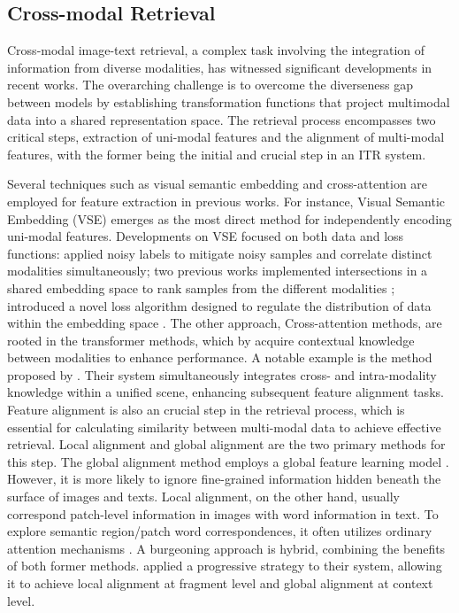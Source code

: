 \documentclass[sigconf, nonacm]{acmart}
\begin{document}
\subsection{Cross-modal Retrieval}
Cross-modal image-text retrieval, a complex task involving the integration of information from diverse modalities, has witnessed significant developments in recent works. The overarching challenge is to overcome the diverseness gap between models by establishing transformation functions that project multimodal data into a shared representation space. The retrieval process encompasses two critical steps, extraction of uni-modal features and the alignment of multi-modal features, with the former being the initial and crucial step in an ITR system.

Several techniques such as visual semantic embedding and cross-attention are employed for feature extraction in previous works. For instance, Visual Semantic Embedding (VSE) emerges as the most direct method for independently encoding uni-modal features. Developments on VSE focused on both data and loss functions: \cite{hu2021learning} applied noisy labels to mitigate noisy samples and correlate distinct modalities simultaneously; two previous works implemented intersections in a shared embedding space to rank samples from the different modalities \cite{chun2021probabilistic} \cite{wang2018learning}; introduced a novel loss algorithm designed to regulate the distribution of data within the embedding space \cite{zheng2020dual}. The other approach, Cross-attention methods, are rooted in the transformer methods, which by acquire contextual knowledge between modalities to enhance performance. A notable example is the method proposed by \cite{cui2021rosita}. Their system simultaneously integrates cross- and intra-modality knowledge within a unified scene, enhancing subsequent feature alignment tasks. \\
Feature alignment is also an crucial step in the retrieval process, which is essential for calculating similarity between multi-modal data to achieve effective retrieval. Local alignment and global alignment are the two primary methods for this step. The global alignment method employs a global feature learning model \cite{faghri2017vse++} \cite{jia2021scaling}. However, it is more likely to ignore fine-grained information hidden beneath the surface of images and texts. Local alignment, on the other hand, usually correspond patch-level information in images with word information in text. To explore semantic region/patch word correspondences, it often utilizes ordinary attention mechanisms \cite{kim2021vilt} \cite{chen2020uniter}. A burgeoning approach is hybrid, combining the benefits of both former methods. \cite{ji2021step} applied a progressive strategy to their system, allowing it to achieve local alignment at fragment level and global alignment at context level.
\end{document}
